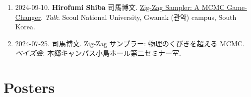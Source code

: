 \documentclass[
  11pt,
]{article}
\begin{document}
\begin{enumerate}
  \href{https://162348.github.io/posts/2024/Slides/IRT-ZigZag.html}{動き出す次世代サンプラー:
  区分確定的モンテカルロ}. \emph{学生研究発表会（統数研）}.
  統数研２階大会議室.
\item
  2024-09-10. \textbf{Hirofumi Shiba} \textbar{} 司馬博文.
  \href{https://162348.github.io/posts/2024/Slides/ZigZagPoliSci.html}{Zig-Zag
  Sampler: A MCMC Game-Changer}. \emph{Talk}. Seoul National University,
  Gwanak ({\cvhangul 관악}) campus, South Korea.
\item
  2024-07-25. 司馬博文.
  \href{https://162348.github.io/posts/2024/Slides/ZigZagSampler.html}{Zig-Zag
  サンプラー: 物理のくびきを超える MCMC}. \emph{ベイズ会}.
  本郷キャンパス小島ホール第二セミナー室.
\end{enumerate}

\section{Posters}\label{posters}
\end{document}
